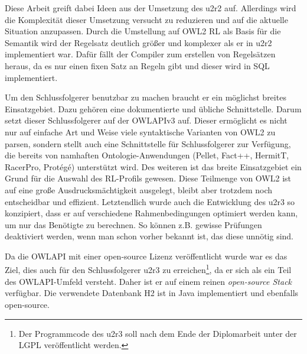 Diese Arbeit greift dabei Ideen aus der Umsetzung des u2r2 \cite{Weithoehner2008} auf. Allerdings wird die Komplexität dieser Umsetzung versucht zu reduzieren und auf die aktuelle Situation anzupassen. Durch die Umstellung auf OWL2 RL als Basis für die Semantik wird der Regelsatz deutlich größer und komplexer als er in u2r2 implementiert war. Dafür fällt der Compiler zum erstellen von Regelsätzen heraus, da es nur einen fixen Satz an Regeln gibt und dieser wird in SQL implementiert.

Um den Schlussfolgerer benutzbar zu machen braucht er ein möglichst breites Einsatzgebiet. Dazu gehören eine dokumentierte und übliche Schnittstelle. Darum setzt dieser Schlussfolgerer auf der OWLAPIv3 \cite{OWLAPI} auf. Dieser ermöglicht es nicht nur auf einfache Art und Weise viele syntaktische Varianten von OWL2 zu parsen, sondern stellt auch eine Schnittstelle für Schlussfolgerer zur Verfügung, die bereits von namhaften Ontologie-Anwendungen (Pellet, Fact++, HermitT, RacerPro, Protégé) unterstützt wird. Des weiteren ist das breite Einsatzgebiet ein Grund für die Auswahl des RL-Profils gewesen. Diese Teilmenge von OWL2 ist auf eine große Ausdrucksmächtigkeit ausgelegt, bleibt aber trotzdem noch entscheidbar und effizient. Letztendlich wurde auch die Entwicklung des u2r3 so konzipiert, dass er auf verschiedene Rahmenbedingungen optimiert werden kann, um nur das Benötigte zu berechnen. So können z.B. gewisse Prüfungen deaktiviert werden, wenn man schon vorher bekannt ist, das diese unnötig sind.

Da die OWLAPI mit einer open-source Lizenz veröffentlicht wurde war es das Ziel, dies auch für den Schlussfolgerer u2r3 zu erreichen\footnote{Der Programmcode des u2r3 soll nach dem Ende der Diplomarbeit unter der LGPL veröffentlicht werden.}, da er sich als ein Teil des OWLAPI-Umfeld versteht. Daher ist er auf einem reinen \emph{open-source Stack} verfügbar. Die verwendete Datenbank H2 ist in Java implementiert und ebenfalls open-source.
